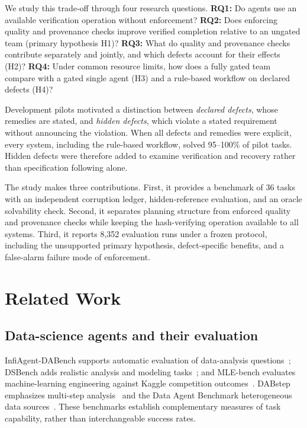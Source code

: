 \documentclass[conference]{IEEEtran}
\begin{document}
We study this trade-off through four research questions. \textbf{RQ1:} Do agents use an available verification operation without enforcement? \textbf{RQ2:} Does enforcing quality and provenance checks improve verified completion relative to an ungated team (primary hypothesis H1)? \textbf{RQ3:} What do quality and provenance checks contribute separately and jointly, and which defects account for their effects (H2)? \textbf{RQ4:} Under common resource limits, how does a fully gated team compare with a gated single agent (H3) and a rule-based workflow on declared defects (H4)?

Development pilots motivated a distinction between \emph{declared defects}, whose remedies are stated, and \emph{hidden defects}, which violate a stated requirement without announcing the violation. When all defects and remedies were explicit, every system, including the rule-based workflow, solved 95--100\% of pilot tasks. Hidden defects were therefore added to examine verification and recovery rather than specification following alone.

The study makes three contributions. First, it provides a benchmark of 36 tasks with an independent corruption ledger, hidden-reference evaluation, and an oracle solvability check. Second, it separates planning structure from enforced quality and provenance checks while keeping the hash-verifying operation available to all systems. Third, it reports 8,352 evaluation runs under a frozen protocol, including the unsupported primary hypothesis, defect-specific benefits, and a false-alarm failure mode of enforcement.

\section{Related Work}
\label{sec:related}
\subsection{Data-science agents and their evaluation}
InfiAgent-DABench supports automatic evaluation of data-analysis questions~\cite{hu2024infiagent}; DSBench adds realistic analysis and modeling tasks~\cite{jing2025dsbench}; and MLE-bench evaluates machine-learning engineering against Kaggle competition outcomes~\cite{chan2025mlebench}. DABstep emphasizes multi-step analysis~\cite{egg2025dabstep} and the Data Agent Benchmark heterogeneous data sources~\cite{ma2026dab}. These benchmarks establish complementary measures of task capability, rather than interchangeable success rates.
\end{document}
